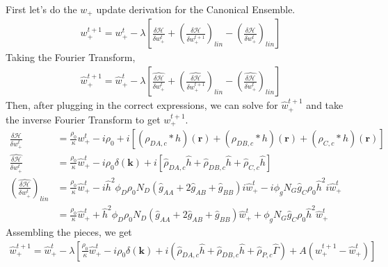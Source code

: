 \documentclass{article}
\begin{document}
  First let's do the $w_+$ update derivation for the Canonical Ensemble.
  \begin{align*}
    w_+^{t+1} =
      w_+^t - \lambda \left[
        \frac{\delta \mathcal{H}}{\delta w_+^t}
        + \left(  \frac{\delta \mathcal{H}}{\delta w_+^{t+1}} \right) _{lin}
        - \left(  \frac{\delta \mathcal{H}}{\delta w_+^{t}} \right) _{lin}
      \right]
  \end{align*}
  Taking the Fourier Transform,
  \begin{align*}
    \hat{w}_+^{t+1} =
      \hat{w}_+^t - \lambda \left[
        \hat{\frac{\delta \mathcal{H}}{\delta w_+^t}}
        + \left( \hat{ \frac{\delta \mathcal{H}}{\delta w_+^{t+1}}} \right) _{lin}
        - \left( \hat{ \frac{\delta \mathcal{H}}{\delta w_+^{t}}} \right) _{lin}
      \right]
  \end{align*}
  Then, after plugging in the correct expressions, we can solve for
    $\hat{w}_+^{t+1}$ and take the inverse Fourier Transform to get $w_+^{t+1}$.
  \begin{align*}
    \frac{\delta \mathcal{H}}{\delta w_+^t} &=
      \frac{\rho_0}{\kappa} w_+^t
      - i\rho_0
      + i [ (\rho_{DA,c} \ast h)(\mathbf{r})
            + (\rho_{DB,c} \ast h)(\mathbf{r})
            + (\rho_{C,c} \ast h)(\mathbf{r}) ] \\
    \hat{\frac{\delta \mathcal{H}}{\delta w_+^t}} &=
      \frac{\rho_0}{\kappa} \hat{w}_+^t
      - i \rho_0 \delta(\mathbf{k})
      + i [ \hat{\rho}_{DA,c} \hat{h}
            + \hat{\rho}_{DB,c} \hat{h}
            + \hat{\rho}_{C,c}  \hat{h} ] \\
    \left( \hat{\frac{\delta \mathcal{H}}{\delta w_+^t}} \right) _{lin} &=
      \frac{\rho_0}{\kappa} \hat{w}_+^t
      - i \hat{h}^2 \phi_D \rho_0 N_D
        (\hat{g}_{AA} + 2 \hat{g}_{AB} + \hat{g}_{BB}) i \hat{w}_+^t
      - i \phi_g N_G \hat{g}_{C} \rho_0 \hat{h}^2 i \hat{w}_+^t \\
    &= \frac{\rho_0}{\kappa} \hat{w}_+^t
      + \hat{h}^2 \phi_D \rho_0 N_D
        (\hat{g}_{AA} + 2 \hat{g}_{AB} + \hat{g}_{BB}) \hat{w}_+^t
      + \phi_g N_G \hat{g}_{C} \rho_0 \hat{h}^2 \hat{w}_+^t
  \end{align*}
  Assembling the pieces, we get
  \begin{align*}
    \hat{w}_+^{t+1} =
      \hat{w}_+^t - \lambda \left[
        \frac{\rho_0}{\kappa} \hat{w}_+^t
        - i \rho_0 \delta(\mathbf{k})
        + i ( \hat{\rho}_{DA,c} \hat{h}
              + \hat{\rho}_{DB,c} \hat{h}
              + \hat{\rho}_{P,c}  \hat{\Gamma} )
        + A (\hat{w}_+^{t+1} - \hat{w}_+^t)
      \right]
  \end{align*}
\end{document}
